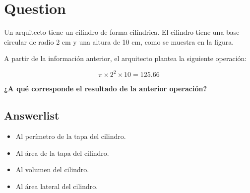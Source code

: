\documentclass[
]{article}
\author{}
\date{\vspace{-2.5em}}
\providecommand{\tightlist}{%
  \setlength{\itemsep}{0pt}\setlength{\parskip}{0pt}}
\begin{document}
\section{Question}\label{question}

Un arquitecto tiene un cilindro de forma cilíndrica. El cilindro tiene
una base circular de radio 2 cm y una altura de 10 cm, como se muestra
en la figura.

\begin{center}
\end{center}

A partir de la información anterior, el arquitecto plantea la siguiente
operación:

\[\pi \times 2^2 \times 10 = 125.66\]

\textbf{¿A qué corresponde el resultado de la anterior operación?}

\subsection{Answerlist}\label{answerlist}

\begin{itemize}
\tightlist
\item
  Al perímetro de la tapa del cilindro.
\item
  Al área de la tapa del cilindro.
\item
  Al volumen del cilindro.
\item
  Al área lateral del cilindro.
\end{itemize}
\end{document}
